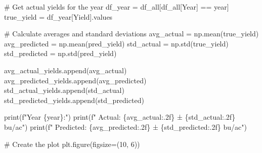 \documentclass[
  letterpaper,
  DIV=11,
  numbers=noendperiod]{scrreprt}
\newenvironment{Shaded}{\begin{snugshade}}{\end{snugshade}}
\newcommand{\BuiltInTok}[1]{\textcolor[rgb]{0.00,0.23,0.31}{#1}}
\newcommand{\CommentTok}[1]{\textcolor[rgb]{0.37,0.37,0.37}{#1}}
\newcommand{\DecValTok}[1]{\textcolor[rgb]{0.68,0.00,0.00}{#1}}
\newcommand{\NormalTok}[1]{\textcolor[rgb]{0.00,0.23,0.31}{#1}}
\newcommand{\OperatorTok}[1]{\textcolor[rgb]{0.37,0.37,0.37}{#1}}
\newcommand{\SpecialCharTok}[1]{\textcolor[rgb]{0.37,0.37,0.37}{#1}}
\newcommand{\SpecialStringTok}[1]{\textcolor[rgb]{0.13,0.47,0.30}{#1}}
\newcommand{\StringTok}[1]{\textcolor[rgb]{0.13,0.47,0.30}{#1}}
\begin{document}
\begin{Shaded}
\begin{Highlighting}[]
        \CommentTok{\# Get actual yields for the year}
\NormalTok{        df\_year }\OperatorTok{=}\NormalTok{ df\_all[df\_all[}\StringTok{\textquotesingle{}Year\textquotesingle{}}\NormalTok{] }\OperatorTok{==}\NormalTok{ year]}
\NormalTok{        true\_yield }\OperatorTok{=}\NormalTok{ df\_year[}\StringTok{\textquotesingle{}Yield\textquotesingle{}}\NormalTok{].values}

        \CommentTok{\# Calculate averages and standard deviations}
\NormalTok{        avg\_actual }\OperatorTok{=}\NormalTok{ np.mean(true\_yield)}
\NormalTok{        avg\_predicted }\OperatorTok{=}\NormalTok{ np.mean(pred\_yield)}
\NormalTok{        std\_actual }\OperatorTok{=}\NormalTok{ np.std(true\_yield)}
\NormalTok{        std\_predicted }\OperatorTok{=}\NormalTok{ np.std(pred\_yield)}

\NormalTok{        avg\_actual\_yields.append(avg\_actual)}
\NormalTok{        avg\_predicted\_yields.append(avg\_predicted)}
\NormalTok{        std\_actual\_yields.append(std\_actual)}
\NormalTok{        std\_predicted\_yields.append(std\_predicted)}

        \BuiltInTok{print}\NormalTok{(}\SpecialStringTok{f"Year }\SpecialCharTok{\{}\NormalTok{year}\SpecialCharTok{\}}\SpecialStringTok{:"}\NormalTok{)}
        \BuiltInTok{print}\NormalTok{(}\SpecialStringTok{f"  Actual: }\SpecialCharTok{\{}\NormalTok{avg\_actual}\SpecialCharTok{:.2f\}}\SpecialStringTok{ ± }\SpecialCharTok{\{}\NormalTok{std\_actual}\SpecialCharTok{:.2f\}}\SpecialStringTok{ bu/ac"}\NormalTok{)}
        \BuiltInTok{print}\NormalTok{(}\SpecialStringTok{f"  Predicted: }\SpecialCharTok{\{}\NormalTok{avg\_predicted}\SpecialCharTok{:.2f\}}\SpecialStringTok{ ± }\SpecialCharTok{\{}\NormalTok{std\_predicted}\SpecialCharTok{:.2f\}}\SpecialStringTok{ bu/ac"}\NormalTok{)}

    \CommentTok{\# Create the plot}
\NormalTok{    plt.figure(figsize}\OperatorTok{=}\NormalTok{(}\DecValTok{10}\NormalTok{, }\DecValTok{6}\NormalTok{))}


\end{Highlighting}
\end{Shaded}
\end{document}
